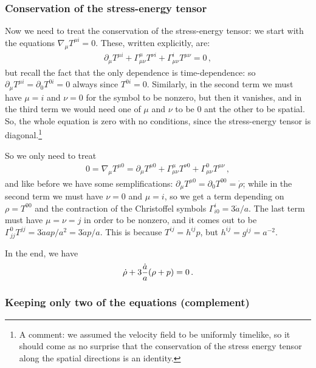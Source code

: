 \documentclass[main.tex]{subfiles}
\begin{document}
\subsubsection{Conservation of the stress-energy tensor}

Now we need to treat the conservation of the stress-energy tensor: we start with the equations \(\nabla_{\mu } T^{\mu  i } = 0 \). These, written explicitly, are: 
%
\begin{align}
\partial_{\mu } T^{\mu i} + \Gamma^{\mu }_{\mu \nu } T^{\nu i } + \Gamma^{i}_{\mu \nu } T^{\mu \nu } =0 
\,,
\end{align}
%
but recall the fact that the only dependence is time-dependence: so \(\partial_{\mu } T^{\mu i} = \partial_{0} T^{0i}=0\) always since \(T^{0i}= 0\). 
Similarly, in the second term we must have \(\mu =i\) and \(\nu = 0\) for the symbol to be nonzero, but then it vanishes, and in the third term we would need one of \(\mu \) and \(\nu \) to be 0 ant the other to be spatial. So, the whole equation is zero with no conditions, since the stress-energy tensor is diagonal.\footnote{A comment: we assumed the velocity field to be uniformly timelike, so it should come as no surprise that the conservation of the stress energy tensor along the spatial directions is an identity.}

So we only need to treat 
%
\begin{align}
0=\nabla_{\mu } T^{\mu 0 }
= \partial_{\mu } T^{\mu 0} 
+ \Gamma^{\mu }_{\mu \nu } T^{\nu 0}
+ \Gamma^{0}_{\mu \nu } T^{\mu \nu }
\,,
\end{align}
%
and like before we have some semplifications: \(\partial_{\mu } T^{\mu 0} = \partial_{0} T^{00} = \dot{\rho}\); while in the second term we must have \(\nu = 0\) and \(\mu =i\), so we get a term depending on \(\rho = T^{00}\) and the contraction of the Christoffel symbols \(\Gamma^{i}_{i0} = 3 \dot{a} / a\). The last term must have \(\mu = \nu = j\) in order to be nonzero, and it comes out to be \(\Gamma^{0}_{jj} T^{jj} = 3 \dot{a} a p/ a^2 = 3 \dot{a} p / a\).
This is because \(T^{ij} = h^{ij} p\), but \(h^{ij} = g^{ij} = a^{-2}\). 

In the end, we have 
%
\begin{align}
\dot{\rho} + 3 \frac{\dot{a}}{a}\qty( \rho + p ) = 0 
\,.
\end{align}
%
\subsubsection{Keeping only two of the equations (complement)}
\end{document}
